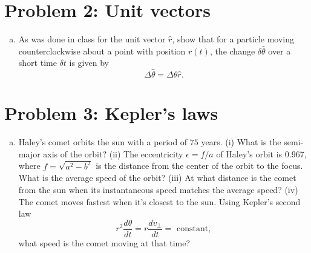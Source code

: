 \documentclass[10pt,letter]{article}
\begin{document}
\section*{Problem 2: Unit vectors}
\begin{enumerate}[(a)]
\item As was done in class for the unit vector $\hat{r}$, show that for a particle moving counterclockwise about a point with position $r(t)$, the change $\delta \hat{\theta}$ over a short time $\delta t$ is given by 
\begin{equation*}
\Delta \hat{\theta} = \Delta \theta \hat{r}.
\end{equation*}
\end{enumerate}
\section*{Problem 3: Kepler's laws}
\begin{enumerate}[(a)]
\item Haley's comet orbits the sun with a period of $75$ years. (i) What is the semi-major axis of the orbit? (ii) The eccentricity $\epsilon = f/a$ of Haley's orbit is $0.967$, where $f = \sqrt{a^2 - b^2}$ is the distance from the center of the orbit to the focus. What is the average speed of the orbit? (iii) At what distance is the comet from the sun when its instantaneous speed matches the average speed? (iv) The comet moves fastest when it's closest to the sun. Using Kepler's second law 
\begin{equation}
r^2 \frac{d\theta}{dt} = r\frac{d v_\perp}{dt} = \text{ constant},
\end{equation} 
what speed is the comet moving at that time?
\end{enumerate}
\end{document}
